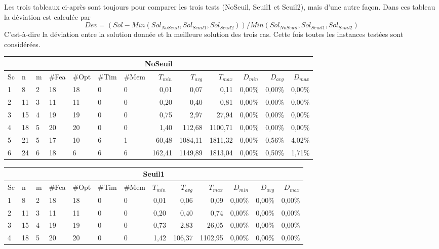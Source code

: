 \documentclass[twoside,fleqn]{EPURapport}
\begin{document}
Les trois tableaux ci-après sont toujours pour comparer les trois tests (NoSeuil, Seuil1 et Seuil2), mais d'une autre façon. Dans ces tableau la déviation est calculée par $$Dev = (Sol - Min(Sol_{NoSeuil}, Sol_{Seuil1}, Sol_{Seuil2}))/Min(Sol_{NoSeuil}, Sol_{Seuil1}, Sol_{Seuil2})$$C'est-à-dire la déviation entre la solution donnée et la meilleure solution des trois cas. Cette fois toutes les instances testées sont considérées. 
\clearpage
\begin{table}[h]
    \centering
    \begin{tabular}{|l|l|l|l|l|l|l|r|r|r|r|r|r|}
    	\hline
    	\multicolumn{13}{|c|}{NoSeuil}\\ \hline
Sc &	n	&m	&\#Fea	&\#Opt	&\#Tim &\#Mem	&$T_{min}$ & $T_{avg}$	& $T_{max}$ & $D_{min}$ & $D_{avg}$	& $D_{max}$ \\ \hline
1&	8 &	2&	18&	18&	0&	0&	0,01&	0,07&	0,11	&0,00\%&	0,00\%&	0,00\%    \\ \hline
2&	11&	3&	11&	11&	0&	0&	0,20&	0,40&	0,81	&0,00\%&	0,00\%&	0,00\%     \\ \hline
3&	15&	4&	19&	19&	0&	0&	0,75&	2,97&	27,94	&0,00\%&	0,00\%&	0,00\%  \\ \hline
4 &	18	&5	&20	    &20	    &0	    & 0	        &1,40	&    112,68	&1100,71	&0,00\%&0,00\%&0,00\% \\ \hline
5 &	21	&5	&17	    &10	    &6	    & 1	        &60,48	&1084,11	&1811,32	&0,00\%&0,56\%&4,02\% \\ \hline
6 &	24	&6	&18	    &6	    &6	    & 6	        &162,41	&1149,89	&1813,04	&0,00\%&0,50\%&1,71\% \\ \hline
    \end{tabular}
    \label{tab_cut2_tab2}
\vspace{2em}
    \begin{tabular}{|l|l|l|l|l|l|l|r|r|r|r|r|r|}
    	\hline
    	\multicolumn{13}{|c|}{Seuil1}\\ \hline
Sc &	n	&m	&\#Fea	&\#Opt	&\#Tim &\#Mem	&$T_{min}$ & $T_{avg}$	& $T_{max}$ & $D_{min}$ & $D_{avg}$	& $D_{max}$ \\ \hline
1&	8 &	2&	18&	18&	0&	0&	0,01&	0,06&	0,09	&0,00\%&	0,00\%&	0,00\%    \\ \hline
2&	11&	3&	11&	11&	0&	0&	0,20&	0,40&	0,74	&0,00\%&	0,00\%&	0,00\%     \\ \hline
3&	15&	4&	19&	19&	0&	0&	0,73&	2,83&	26,05	&0,00\%&	0,00\%&	0,00\%  \\ \hline
4&	18&	5&	20&	20&	0&	0&	1,42	&106,37	&1102,95	&0,00\% &  0,00\%  &  0,00\%     \\ \hline

\end{tabular}
\end{table}
\end{document}
